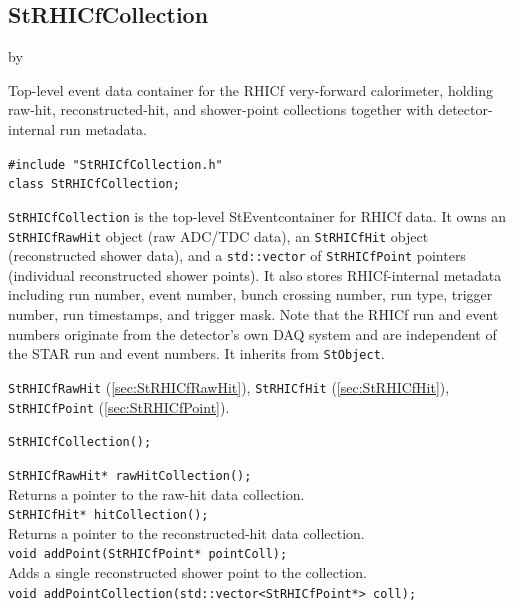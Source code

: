\documentclass[twoside]{article}
\newcommand{\StEvent}{\textsf{StEvent}}
\newcommand{\entrylabel}[1]{\mbox{\textbf{{#1}}}\hfil}%
\newenvironment{entry}
{\begin{list}{}%
    {\renewcommand{\makelabel}{\entrylabel}%
     \setlength{\labelwidth}{90pt}%
     \setlength{\leftmargin}{\labelwidth}
     \advance\leftmargin by \labelsep%
      }%
    }%
  {\end{list}}
\newcommand{\Entrylabel}[1]%
{\raisebox{0pt}[1ex][0pt]{\makebox[\labelwidth][l]%
    {\parbox[t]{\labelwidth}{\hspace{0pt}\textbf{{#1}}}}}}
\newenvironment{Entry}%
{\renewcommand{\entrylabel}{\Entrylabel}\begin{entry}}%
  {\end{entry}}
\begin{document}
\subsection{StRHICfCollection}
\label{sec:StRHICfCollection}
\begin{Entry}
\item[Summary] Top-level event data container for the RHICf very-forward
    calorimeter, holding raw-hit, reconstructed-hit, and shower-point collections
    together with detector-internal run metadata.
\item[Synopsis]
    \verb+#include "StRHICfCollection.h"+\\
    \verb+class StRHICfCollection;+\\
\item[Description]
    \texttt{StRHICfCollection} is the top-level \StEvent container for RHICf
    data.  It owns an \texttt{StRHICfRawHit} object (raw ADC/TDC data), an
    \texttt{StRHICfHit} object (reconstructed shower data), and a
    \texttt{std::vector} of \texttt{StRHICfPoint} pointers (individual
    reconstructed shower points).  It also stores RHICf-internal metadata
    including run number, event number, bunch crossing number, run type,
    trigger number, run timestamps, and trigger mask.  Note that the RHICf run
    and event numbers originate from the detector's own DAQ system and are
    independent of the STAR run and event numbers.
    It inherits from \texttt{StObject}.
\item[Related Classes]
    \texttt{StRHICfRawHit} (\ref{sec:StRHICfRawHit}),
    \texttt{StRHICfHit} (\ref{sec:StRHICfHit}),
    \texttt{StRHICfPoint} (\ref{sec:StRHICfPoint}).
\item[Public\\ Constructors]
    \verb+StRHICfCollection();+\\
\item[Public Member\\ Functions]
    \verb+StRHICfRawHit* rawHitCollection();+\\
    Returns a pointer to the raw-hit data collection.\\
    \verb+StRHICfHit* hitCollection();+\\
    Returns a pointer to the reconstructed-hit data collection.\\
    \verb+void addPoint(StRHICfPoint* pointColl);+\\
    Adds a single reconstructed shower point to the collection.\\
    \verb+void addPointCollection(std::vector<StRHICfPoint*> coll);+\\

\end{Entry}
\end{document}
